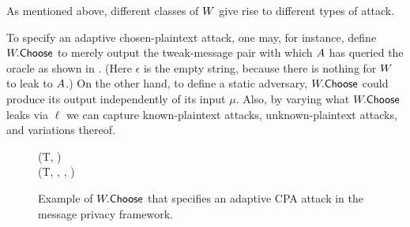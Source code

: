 
As mentioned above, different classes of $W$ give rise to different types of attack.

To specify an adaptive chosen-plaintext attack, one may, for instance, define $W.\mathsf{Choose}$ to merely output the tweak-message pair with which $A$ has queried the oracle as shown in . (Here $\epsilon$ is the empty string, because there is nothing for $W$ to leak to $A$.) On the other hand, to define a static adversary, $W.\mathsf{Choose}$ could produce its output independently of its input $\mu$. Also, by varying what $W.\mathsf{Choose}$ leaks via $\ell$ we can capture known-plaintext attacks, unknown-plaintext attacks, and variations thereof.

\begin{figure} [t]
\begin{center}
\fbox
{
\begin{pchstack}
\procedure{$\choice{\sampW}(\mu, \sigma)$}
  {
    (T, \msg) \gets \mu \\
    \pcreturn (T, \msg, \sigma, \epsilon)
  }
    \pchspace
\end{pchstack}
}
\end{center}
\vspace{-2ex}
\caption{ Example of $W.\mathsf{Choose}$ that specifies an adaptive CPA attack in the message privacy framework. }
\label{fig-fpe-ch}
\hrulefill
\end{figure}
